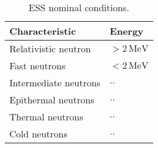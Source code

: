 \begin{table}[ht]
  \centering
  \caption[ESS nominal conditions]
  {ESS nominal conditions.}
  \label{chap1:tab:neutronsT}
  \begin{tabularx}{\linewidth}{XX}
    \toprule
    Characteristic        & Energy              \\
    \midrule
    Relativistic neutron  & $> 2\,\mathrm{MeV}$ \\
    Fast neutrons         & $< 2\,\mathrm{MeV}$ \\
    Intermediate neutrons & $..$                 \\
    Epithermal neutrons   & $..$                 \\
    Thermal neutrons      & $..$                 \\
    Cold neutrons         & $..$                 \\
    \bottomrule
  \end{tabularx}
\end{table}